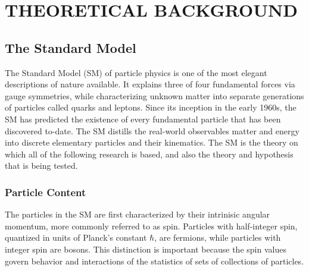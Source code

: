 %
%

\chapter{THEORETICAL BACKGROUND}
\section{The Standard Model}
The Standard Model (SM) of particle physics is one of the most elegant descriptions of nature available. It explains three of four fundamental forces via gauge symmetries, while characterizing unknown matter into
separate generations of particles called quarks and leptons. Since its inception in the early 1960s, the SM has predicted the existence of every fundamental particle that has been discovered to-date.
The SM distills the real-world observables matter and energy into discrete elementary particles and their kinematics. The SM is the theory on which all of the following research is based, and also the theory and hypothesis that is being tested.

\subsection{Particle Content}
The particles in the SM are first characterized by their intrinisic angular momentum, more commonly referred to as spin. Particles with half-integer spin, quantized in units of Planck's constant $\hbar$, are fermions, while particles with integer spin are bosons.
This distinction is important because the spin values govern behavior and interactions of the statistics of sets of collections of particles. 

